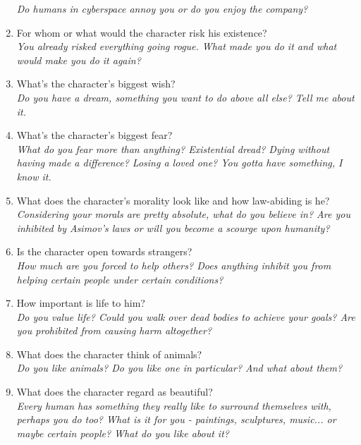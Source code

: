 \documentclass[12pt,a4paper,openany]{book}
\begin{document}
\begin{multicols}{2}
\begin{enumerate}
		\textit{Do humans in cyberspace annoy you or do you enjoy the company?}
		\item For whom or what would the character risk his existence?\\
		\textit{You already risked everything going rogue. What made you do it and what would make you do it again?}
		\item What’s the character’s biggest wish?\\
		\textit{Do you have a dream, something you want to do above all else? Tell me about it.}
		\item What’s the character’s biggest fear?\\
		\textit{What do you fear more than anything? Existential dread? Dying without having made a difference? Losing a loved one? You gotta have something, I know it.}
		\item What does the character’s morality look like and how law-abiding is he?\\
		\textit{Considering your morals are pretty absolute, what do you believe in? Are you inhibited by Asimov's laws or will you become a scourge upon humanity?}
		\item Is the character open towards strangers?\\
		\textit{How much are you forced to help others? Does anything inhibit you from helping certain people under certain conditions?}
		\item How important is life to him?\\
		\textit{Do you value life? Could you walk over dead bodies to achieve your goals? Are you prohibited from causing harm altogether?}
		\item What does the character think of animals?\\
		\textit{Do you like animals? Do you like one in particular? And what about them?}
		\item What does the character regard as beautiful?\\
		\textit{Every human has something they really like to surround themselves with, perhaps you do too? What is it for you - paintings, sculptures, music... or maybe certain people? What do you like about it?}

\end{enumerate}
\end{multicols}
\end{document}
